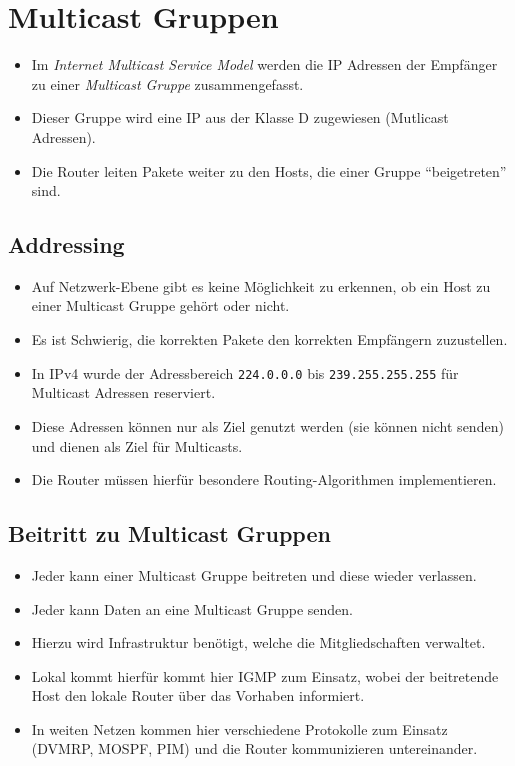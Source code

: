 	\section{Multicast Gruppen}
		\begin{itemize}
			\item Im \textit{Internet Multicast Service Model} werden die IP Adressen der Empfänger zu einer \textit{Multicast Gruppe} zusammengefasst.
			\item Dieser Gruppe wird eine IP aus der Klasse D zugewiesen (Mutlicast Adressen).
			\item Die Router leiten Pakete weiter zu den Hosts, die einer Gruppe \enquote{beigetreten} sind.
		\end{itemize}

		\subsection{Addressing}
			\begin{itemize}
				\item Auf Netzwerk-Ebene gibt es keine Möglichkeit zu erkennen, ob ein Host zu einer Multicast Gruppe gehört oder nicht.
				\item Es ist Schwierig, die korrekten Pakete den korrekten Empfängern zuzustellen.
				\item In IPv4 wurde der Adressbereich \texttt{224.0.0.0} bis \texttt{239.255.255.255} für Multicast Adressen reserviert.
				\item Diese Adressen können nur als Ziel genutzt werden (sie können nicht senden) und dienen als Ziel für Multicasts.
				\item Die Router müssen hierfür besondere Routing-Algorithmen implementieren.
			\end{itemize}

		\subsection{Beitritt zu Multicast Gruppen}
			\begin{itemize}
				\item Jeder kann einer Multicast Gruppe beitreten und diese wieder verlassen.
				\item Jeder kann Daten an eine Multicast Gruppe senden.
				\item Hierzu wird Infrastruktur benötigt, welche die Mitgliedschaften verwaltet.
				\item Lokal kommt hierfür kommt hier IGMP zum Einsatz, wobei der beitretende Host den lokale Router über das Vorhaben informiert.
				\item In weiten Netzen kommen hier verschiedene Protokolle zum Einsatz (DVMRP, MOSPF, PIM) und die Router kommunizieren untereinander.
			\end{itemize}

